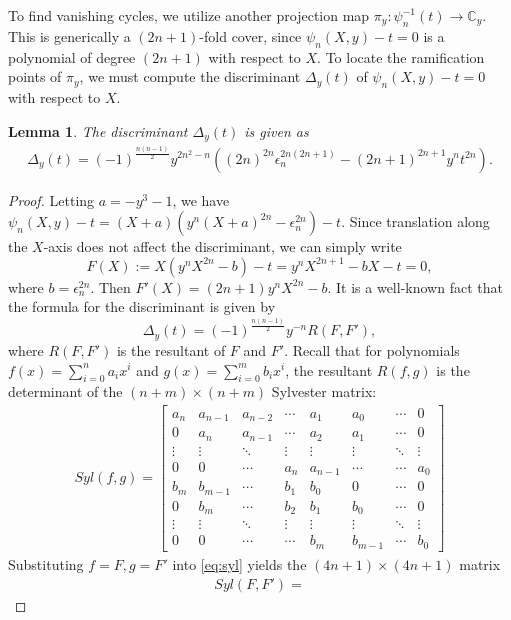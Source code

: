 \documentclass[10pt,a4paper,reqno]{amsart}
\newtheorem{lem}[thm]{Lemma}
\theoremstyle{definition}
\numberwithin{equation}{section}
\numberwithin{figure}{section}
\newcommand{\C}{\mathbb{C}}
\newcommand{\ep}{\epsilon}
\newcommand{\arrowr}{\rightarrow}
\begin{document}
To find vanishing cycles, we utilize another projection map $\pi_y: \psi^{-1}_n(t) \arrowr \C_y$.
This is generically a $(2n+1)$-fold cover, since $\psi_n(X,y)-t=0$ is a polynomial of degree $(2n+1)$ with respect to $X$.
To locate the ramification points of $\pi_y$, we must compute the discriminant $\Delta_y(t)$ of $\psi_n(X,y)-t=0$ with respect to $X$.

\begin{lem} \label{lem:discriminant_1}
The discriminant $\Delta_y(t)$ is given as
\begin{align}
\Delta_y(t)=(-1)^{\frac{n(n-1)}{2}} y^{2n^2-n}((2n)^{2n}{\ep_n^{2n(2n+1)}}-(2n+1)^{2n+1}y^n t^{2n}).
\end{align}
\end{lem}

\begin{proof}
Letting $a=-y^3-1$, we have $\psi_n(X,y)-t=(X+a)(y^n (X+a)^{2n}-{\ep_n^{2n}})-t$.
Since translation along the $X$-axis does not affect the discriminant, we can simply write 
\[F(X):=X(y^n X^{2n}-b)-t=y^n X^{2n+1}-bX-t=0,\]
where $b={\ep_n^{2n}}$.
Then $F'(X)=(2n+1)y^n X^{2n}-b$.
It is a well-known fact that the formula for the discriminant is given by 
\[\Delta_y(t)=(-1)^{\frac{n(n-1)}{2}} y^{-n} R(F,F'),\] 
where $R(F,F')$ is the resultant of $F$ and $F'$.
Recall that for polynomials $f(x)=\sum_{i=0}^n a_i x^i$ and $g(x)=\sum_{i=0}^m b_i x^i$, 
the resultant $R(f,g)$ is the determinant of the $(n+m)\times (n+m)$ Sylvester matrix:
\begin{align}
Syl(f,g)=
\begin{bmatrix} \label{eq:syl}
a_n & a_{n-1} &a_{n-2} & \cdots &a_{1}  & a_{0} & \cdots & 0 \\
0 & a_{n} &a_{n-1} & \cdots &a_{2}  & a_{1} & \cdots & 0 \\
\vdots & \vdots &\ddots & \vdots & \vdots &\vdots & \ddots &\vdots \\
0&0&\cdots&a_n&a_{n-1}&\cdots&\cdots&a_0 \\
b_m&b_{m-1}&\cdots&b_1&b_0&0&\cdots &0 \\
0&b_{m}&\cdots&b_2&b_1&b_0&\cdots &0 \\
\vdots &\vdots &\ddots&\vdots &\vdots &\vdots &\ddots &\vdots \\
0&0&\cdots&\cdots&b_m&b_{m-1}&\cdots&b_0
\end{bmatrix}
\end{align}
Substituting $f=F, g=F'$ into \eqref{eq:syl} yields the $(4n+1)\times (4n+1)$ matrix
\begin{align*}
Syl(F,F')=

\end{align*}
\end{proof}
\end{document}
